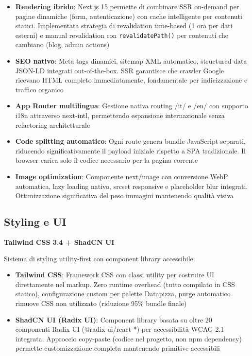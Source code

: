 \begin{itemize}
  \item \textbf{Rendering ibrido}: Next.js 15 permette di combinare SSR on-demand per pagine dinamiche (form, autenticazione) con cache intelligente per contenuti statici. Implementata strategia di revalidation time-based (1 ora per dati esterni) e manual revalidation con \texttt{revalidatePath()} per contenuti che cambiano (blog, admin actions)
  
  \item \textbf{SEO nativo}: Meta tags dinamici, sitemap XML automatico, structured data JSON-LD integrati out-of-the-box. SSR garantisce che crawler Google ricevano HTML completo immediatamente, fondamentale per indicizzazione e traffico organico
  
  \item \textbf{App Router multilingua}: Gestione nativa routing /it/ e /en/ con supporto i18n attraverso next-intl, permettendo espansione internazionale senza refactoring architetturale
  
  \item \textbf{Code splitting automatico}: Ogni route genera bundle JavaScript separati, riducendo significativamente il payload iniziale rispetto a SPA tradizionale. Il browser carica solo il codice necessario per la pagina corrente
  
  \item \textbf{Image optimization}: Componente next/image con conversione WebP automatica, lazy loading nativo, srcset responsive e placeholder blur integrati. Ottimizzazione significativa del peso immagini mantenendo qualità visiva
\end{itemize}

\subsection{Styling e UI}

\textbf{Tailwind CSS 3.4 + ShadCN UI}

Sistema di styling utility-first con component library accessibile:

\begin{itemize}
  \item \textbf{Tailwind CSS}: Framework CSS con classi utility per costruire UI direttamente nel markup. Zero runtime overhead (tutto compilato in CSS statico), configurazione custom per palette Datapizza, purge automatico rimuove CSS non utilizzato (riduzione 95\% bundle finale)
  
  \item \textbf{ShadCN UI (Radix UI)}: Component library basata su oltre 20 componenti Radix UI (@radix-ui/react-*) per accessibilità WCAG 2.1 integrata. Approccio copy-paste (codice nel progetto, non npm dependency) permette customizzazione completa mantenendo primitive accessibili
\end{itemize}

